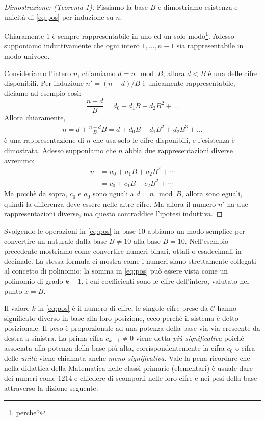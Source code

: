 \documentclass[a4paper]{book}
\theoremstyle{definition}
\begin{document}
\begin{proof}[Dimostrazione: (Teorema 1)]
Fissiamo la base $B$ e dimostriamo esistenza e unicità di \eqref{eq:pos} per induzione su $n$.

Chiaramente $1$ è sempre rappresentabile in uno ed un solo modo\footnote{perche?}. Adesso supponiamo induttivamente che ogni intero
$1,\ldots,n-1$ sia rappresentabile in modo univoco. 

\noindent Consideriamo l'intero $n$, chiamiamo $d = n \mod B$, allora $d < B$ è una delle cifre disponibili. Per induzione $n' = (n-d)/B$ è unicamente rappresentabile, diciamo ad esempio così:
\[ \frac{n-d}{B} = d_0 + d_1 B + d_2 B^2 + \ldots \]
Allora chiaramente,
\begin{align*}
n = d + \frac{n-d}{B}B = d + d_0 B + d_1 B^2 + d_2 B^3 + \ldots
\end{align*}
è una rappresentazione di $n$ che usa solo le cifre disponibili, e l'esistenza è dimostrata.
Adesso supponiamo che $n$ abbia due rappresentazioni diverse avremmo:
\begin{align*}
n &= a_0 + a_1B + a_2B^2 + \cdots\\
  &= c_0 + c_1B + c_2B^2 + \cdots
\end{align*}
Ma poichè da sopra, $c_0$ e $a_0$ sono uguali a $d = n \mod B$, allora sono eguali, quindi la differenza deve essere nelle altre cifre. Ma allora il numero $n'$ ha due rappresentazioni diverse, ma questo 
contraddice l'ipotesi induttiva.
\end{proof}


Svolgendo le operazioni in \eqref{eq:pos} in base $10$ abbiamo un modo
semplice per convertire un naturale dalla base $B \neq 10$ alla base $B = 10$.
Nell'esempio precedente mostriamo come convertire numeri binari, ottali o
esadecimali in decimale. La stessa formula ci mostra come i numeri siano
strettamente collegati al concetto di polinomio: la somma in \eqref{eq:pos} può essere
vista come un polinomio di grado $k-1$, i cui coefficienti sono le cifre
dell'intero, valutato nel punto $x = B$.

Il valore $k$ in \eqref{eq:pos} è il numero di cifre, le singole cifre prese da
$\mathcal{C}$ hanno significato diverso in base alla loro posizione, ecco
perché il sistema è detto posizionale. Il peso è proporzionale ad una potenza
della base via via crescente da destra a sinistra. La prima cifra $c_{k-1} \neq
0$ viene detta \emph{più significativa} poiché associata alla potenza della
base più alta, corrispondentemente la cifra $c_0$ o cifra delle \emph{unità}
viene chiamata anche \emph{meno significativa}. Vale la pena ricordare che nella didattica della Matematica nelle classi primarie (elementari) 
è usuale dare dei numeri come $1214$ e chiedere di scomporli nelle
loro cifre e nei pesi della base attraverso la dizione seguente:
\end{document}

